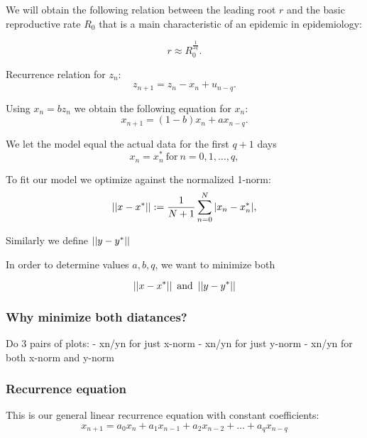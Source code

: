 We will obtain the following relation between the leading root $r$ and the basic reproductive rate $R_0$ that is a main characteristic of an epidemic in epidemiology:

\begin{equation}\label{eq:R0}
    r \approx R_0^{\frac1{2q}}.
\end{equation}

Recurrence relation for $z_n$:
\begin{equation} \label{eq:znrecurr}
    z_{n+1} = z_n - x_n + u_{n-q}.
\end{equation}

Using $x_n = bz_n$ we obtain the following equation for $x_n$:
\begin{equation} \label{eq:xnrecurr}
    x_{n+1} = (1 - b) x_n + ax_{n-q}.
\end{equation}

We let the model equal the actual data for the first $q+1$ days
\begin{equation} \label{eq:xn0q}
x_n = x^*_n \ \text{for} \ n = 0, 1, \dots , q,
\end{equation}

 To fit our model we optimize against the normalized 1-norm:
\begin{equation}\label{eq:xnnorm}
    \left|\left|x-x^*\right|\right|:= \frac{1}{N+1} \sum\limits_{n=0}^N |x_n-x_n^*|,
\end{equation}

Similarly we define $\left|\left|y-y^*\right|\right|$

In order to determine values $a,b,q$, we want to minimize both 

\begin{equation} \label{eq:norms}
    \left|\left|x-x^*\right|\right| \ \text{and} \ \left|\left|y-y^*\right|\right|
\end{equation}

\subsubsection{Why minimize both  diatances?}

Do 3 pairs of plots: 
- xn/yn for just x-norm
- xn/yn for just y-norm
- xn/yn for both x-norm and y-norm


\subsubsection{Recurrence equation}

This is our general linear recurrence equation with constant coefficients:
\begin{equation}\label{eq:an}
    x_{n+1} = a_0x_n + a_1x_{n-1} + a_2x_{n-2} + \dots + a_{q}x_{n-q}
\end{equation}

